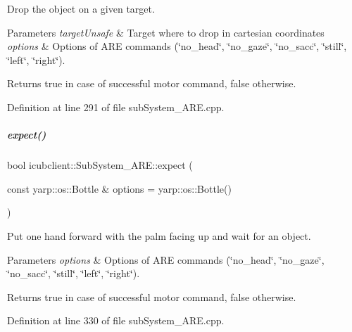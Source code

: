 Drop the object on a given target. 


\begin{DoxyParams}{Parameters}
{\em target\+Unsafe} & Target where to drop in cartesian coordinates \\
\hline
{\em options} & Options of A\+RE commands (\char`\"{}no\+\_\+head\char`\"{}, \char`\"{}no\+\_\+gaze\char`\"{}, \char`\"{}no\+\_\+sacc\char`\"{}, \char`\"{}still\char`\"{}, \char`\"{}left\char`\"{}, \char`\"{}right\char`\"{}). \\
\hline
\end{DoxyParams}
\begin{DoxyReturn}{Returns}
true in case of successful motor command, false otherwise. 
\end{DoxyReturn}


Definition at line 291 of file sub\+System\+\_\+\+A\+R\+E.\+cpp.

\mbox{\label{group__icubclient__subsystems_adab52bf105b04e4e40ab2ce216350648}} 
\subparagraph{\texorpdfstring{expect()}{expect()}}
{\footnotesize\ttfamily bool icubclient\+::\+Sub\+System\+\_\+\+A\+R\+E\+::expect (\begin{DoxyParamCaption}\item[{const yarp\+::os\+::\+Bottle \&}]{options = {\ttfamily yarp\+:\+:os\+:\+:Bottle()} }\end{DoxyParamCaption})}



Put one hand forward with the palm facing up and wait for an object. 


\begin{DoxyParams}{Parameters}
{\em options} & Options of A\+RE commands (\char`\"{}no\+\_\+head\char`\"{}, \char`\"{}no\+\_\+gaze\char`\"{}, \char`\"{}no\+\_\+sacc\char`\"{}, \char`\"{}still\char`\"{}, \char`\"{}left\char`\"{}, \char`\"{}right\char`\"{}). \\
\hline
\end{DoxyParams}
\begin{DoxyReturn}{Returns}
true in case of successful motor command, false otherwise. 
\end{DoxyReturn}


Definition at line 330 of file sub\+System\+\_\+\+A\+R\+E.\+cpp.

